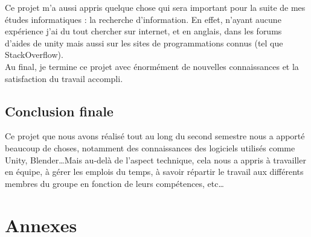 \documentclass[12pt, titlepage]{article}
\begin{document}
\begin{spacing}{1.5}
Ce projet m'a aussi appris quelque chose qui sera important pour la suite de mes études informatiques : la recherche d'information. En effet, n'ayant aucune expérience j'ai du tout chercher sur internet, et en anglais, dans les forums d'aides de unity mais aussi sur les sites de programmations connus (tel que StackOverflow). \\

Au final, je termine ce projet avec énormément de nouvelles connaissances et la satisfaction du travail accompli.\\

\newpage

\subsection{Conclusion finale}

Ce projet que nous avons réalisé tout au long du second semestre nous a apporté beaucoup de choses, notamment des connaissances des logiciels utilisés comme Unity, Blender\dots Mais au-delà de l'aspect technique, cela nous a appris à travailler en équipe, à gérer les emplois du temps, à savoir répartir le travail aux différents membres du groupe en fonction de leurs compétences, etc\dots

\newpage
\section{Annexes}

\end{spacing}
\end{document}
